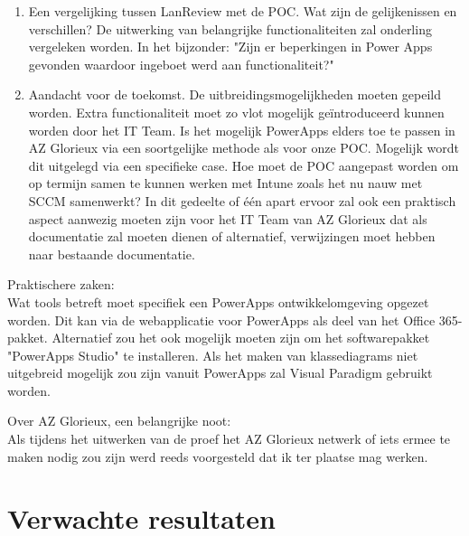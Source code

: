 \begin{enumerate}
    \item Een vergelijking tussen LanReview met de POC. Wat zijn de gelijkenissen en verschillen? De uitwerking van belangrijke functionaliteiten zal onderling vergeleken worden. In het bijzonder: "Zijn er beperkingen in Power Apps gevonden waardoor ingeboet werd aan functionaliteit?"
    \item Aandacht voor de toekomst. De uitbreidingsmogelijkheden moeten gepeild worden. Extra functionaliteit moet zo vlot mogelijk geïntroduceerd kunnen worden door het IT Team. Is het mogelijk PowerApps elders toe te passen in AZ Glorieux via een soortgelijke methode als voor onze POC. Mogelijk wordt dit uitgelegd via een specifieke case. Hoe moet de POC aangepast worden om op termijn samen te kunnen werken met Intune zoals het nu nauw met SCCM samenwerkt? In dit gedeelte of één apart ervoor zal ook een praktisch aspect aanwezig moeten zijn voor het IT Team van AZ Glorieux dat als documentatie zal moeten dienen of alternatief, verwijzingen moet hebben naar bestaande documentatie.
\end{enumerate}


\vspace{5mm}

Praktischere zaken:\\
Wat tools betreft moet specifiek een PowerApps ontwikkelomgeving opgezet worden. Dit kan via de webapplicatie voor PowerApps als deel van het Office 365-pakket. Alternatief zou het ook mogelijk moeten zijn om het softwarepakket "PowerApps Studio" te installeren. Als het maken van klassediagrams niet uitgebreid mogelijk zou zijn vanuit PowerApps zal Visual Paradigm gebruikt worden. 

Over AZ Glorieux, een belangrijke noot:\\
Als tijdens het uitwerken van de proef het AZ Glorieux netwerk of iets ermee te maken nodig zou zijn werd reeds voorgesteld dat ik ter plaatse mag werken.

\section{Verwachte resultaten}
\label{sec:verwachte_resultaten}

